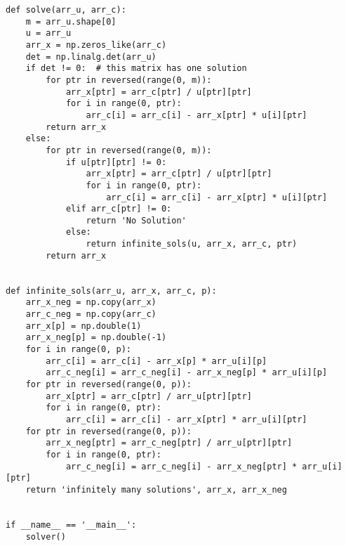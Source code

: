 \documentclass{article}
\begin{document}
\begin{verbatim}
def solve(arr_u, arr_c):
    m = arr_u.shape[0]
    u = arr_u
    arr_x = np.zeros_like(arr_c)
    det = np.linalg.det(arr_u)
    if det != 0:  # this matrix has one solution
        for ptr in reversed(range(0, m)):
            arr_x[ptr] = arr_c[ptr] / u[ptr][ptr]
            for i in range(0, ptr):
                arr_c[i] = arr_c[i] - arr_x[ptr] * u[i][ptr]
        return arr_x
    else:
        for ptr in reversed(range(0, m)):
            if u[ptr][ptr] != 0:
                arr_x[ptr] = arr_c[ptr] / u[ptr][ptr]
                for i in range(0, ptr):
                    arr_c[i] = arr_c[i] - arr_x[ptr] * u[i][ptr]
            elif arr_c[ptr] != 0:
                return 'No Solution'
            else:
                return infinite_sols(u, arr_x, arr_c, ptr)
        return arr_x


def infinite_sols(arr_u, arr_x, arr_c, p):
    arr_x_neg = np.copy(arr_x)
    arr_c_neg = np.copy(arr_c)
    arr_x[p] = np.double(1)
    arr_x_neg[p] = np.double(-1)
    for i in range(0, p):
        arr_c[i] = arr_c[i] - arr_x[p] * arr_u[i][p]
        arr_c_neg[i] = arr_c_neg[i] - arr_x_neg[p] * arr_u[i][p]
    for ptr in reversed(range(0, p)):
        arr_x[ptr] = arr_c[ptr] / arr_u[ptr][ptr]
        for i in range(0, ptr):
            arr_c[i] = arr_c[i] - arr_x[ptr] * arr_u[i][ptr]
    for ptr in reversed(range(0, p)):
        arr_x_neg[ptr] = arr_c_neg[ptr] / arr_u[ptr][ptr]
        for i in range(0, ptr):
            arr_c_neg[i] = arr_c_neg[i] - arr_x_neg[ptr] * arr_u[i][ptr]
    return 'infinitely many solutions', arr_x, arr_x_neg


if __name__ == '__main__':
    solver()

\end{verbatim}
\end{document}

